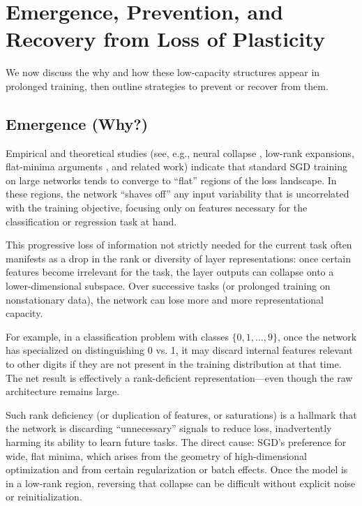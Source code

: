 \documentclass[11pt]{article}
\begin{document}
\section{Emergence, Prevention, and Recovery from Loss of Plasticity}

We now discuss the why and how these low-capacity structures appear in prolonged training, then outline strategies to prevent or recover from them.

\subsection{Emergence (Why?)}
Empirical and theoretical studies (see, e.g., neural collapse \cite{Papyan2020neural}, low-rank expansions\cite{Arora2019finegrain}, flat-minima arguments \cite{Hochreiter1997flat, Keskar2017large}, and related work) indicate that standard SGD training on large networks tends to converge to ``flat'' regions of the loss landscape. In these regions, the network ``shaves off'' any input variability that is uncorrelated with the training objective, focusing only on features necessary for the classification or regression task at hand.

This progressive loss of information not strictly needed for the current task often manifests as a drop in the rank or diversity of layer representations: once certain features become irrelevant for the task, the layer outputs can collapse onto a lower-dimensional subspace. Over successive tasks (or prolonged training on nonstationary data), the network can lose more and more representational capacity.

For example, in a classification problem with classes $\{0,1,\dots,9\}$, once the network has specialized on distinguishing 0 vs. 1, it may discard internal features relevant to other digits if they are not present in the training distribution at that time. The net result is effectively a rank-deficient representation---even though the raw architecture remains large.

Such rank deficiency (or duplication of features, or saturations) is a hallmark that the network is discarding ``unnecessary'' signals to reduce loss, inadvertently harming its ability to learn future tasks. The direct cause: SGD's preference for wide, flat minima, which arises from the geometry of high-dimensional optimization \cite{Hochreiter1997flat, Chaudhari2019entropy} and from certain regularization or batch effects. Once the model is in a low-rank region, reversing that collapse can be difficult without explicit noise or reinitialization.
\end{document}

